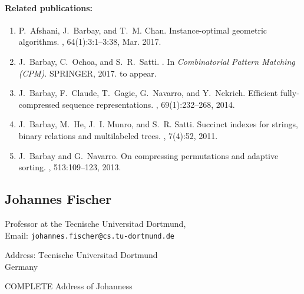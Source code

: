 \documentclass[a4paper,10pt]{article}
\begin{document}
\paragraph{Related publications:}
\begin{enumerate}
\item 
P.~Afshani, J.~Barbay, and T.~M. Chan.
\newblock Instance-optimal geometric algorithms.
, 64(1):3:1--3:38, Mar. 2017.


\item
J.~{Barbay}, C.~{Ochoa}, and S.~R.~{Satti}.
.
\newblock In {\em Combinatorial Pattern Matching (CPM)}. SPRINGER, 2017.
\newblock to appear.

\item
J.~Barbay, F.~Claude, T.~Gagie, G.~Navarro, and Y.~Nekrich.
\newblock Efficient fully-compressed sequence representations.
, 69(1):232--268, 2014.

\item
J.~Barbay, M.~He, J.~I. Munro, and S.~R. Satti.
\newblock Succinct indexes for strings, binary relations and multilabeled
  trees.
 , 7(4):52, 2011.

\item
J.~Barbay and G.~Navarro.
\newblock On compressing permutations and adaptive sorting.
, 513:109--123, 2013.
\end{enumerate}


\subsection*{Johannes Fischer}

\begin{multicols}{2}
\noindent Professor at the Tecnische Universitad Dortmund, \\
Email: \texttt{johannes.fischer@cs.tu-dortmund.de} \\
\begin{tabbing}
Address: \=  Tecnische Universitad Dortmund \\
\> Germany
\end{tabbing}
\begin{TODO}
COMPLETE Address of Johanness
\end{TODO}
\end{multicols}
\end{document}
